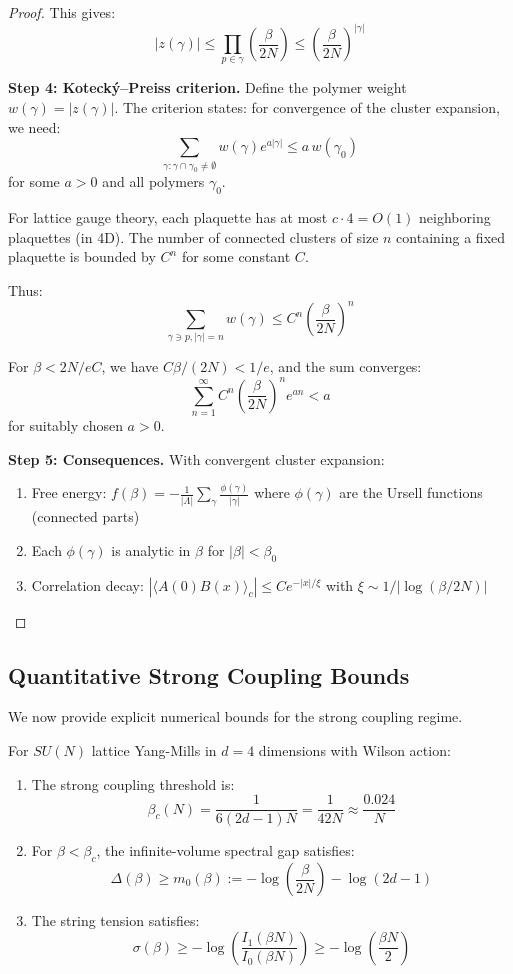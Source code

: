 \begin{proof}
This gives:
\[
|z(\gamma)| \leq \prod_{p \in \gamma} \left(\frac{\beta}{2N}\right) \leq 
\left(\frac{\beta}{2N}\right)^{|\gamma|}
\]

\textbf{Step 4: Koteck\'y--Preiss criterion.}
Define the polymer weight $w(\gamma) = |z(\gamma)|$. The criterion states:
for convergence of the cluster expansion, we need:
\[
\sum_{\gamma : \gamma \cap \gamma_0 \neq \emptyset} w(\gamma) e^{a|\gamma|} \leq a \, w(\gamma_0)
\]
for some $a > 0$ and all polymers $\gamma_0$.

For lattice gauge theory, each plaquette has at most $c \cdot 4 = O(1)$ 
neighboring plaquettes (in 4D). The number of connected clusters of size $n$ 
containing a fixed plaquette is bounded by $C^n$ for some constant $C$.

Thus:
\[
\sum_{\gamma \ni p, |\gamma|=n} w(\gamma) \leq C^n \left(\frac{\beta}{2N}\right)^n
\]

For $\beta < 2N/eC$, we have $C\beta/(2N) < 1/e$, and the sum converges:
\[
\sum_{n=1}^\infty C^n \left(\frac{\beta}{2N}\right)^n e^{an} < a
\]
for suitably chosen $a > 0$.

\textbf{Step 5: Consequences.}
With convergent cluster expansion:
\begin{enumerate}[label=(\alph*)]
\item Free energy: $f(\beta) = -\frac{1}{|\Lambda|}\sum_\gamma \frac{\phi(\gamma)}{|\gamma|}$ 
where $\phi(\gamma)$ are the Ursell functions (connected parts)
\item Each $\phi(\gamma)$ is analytic in $\beta$ for $|\beta| < \beta_0$
\item Correlation decay: $|\langle A(0)B(x)\rangle_c| \leq Ce^{-|x|/\xi}$ 
with $\xi \sim 1/|\log(\beta/2N)|$
\end{enumerate}
\end{proof}

\subsection{Quantitative Strong Coupling Bounds}
\label{subsec:quantitative-strong-coupling}

We now provide explicit numerical bounds for the strong coupling regime.

\begin{theorem}
\label{thm:explicit-strong-constants}
For $SU(N)$ lattice Yang-Mills in $d=4$ dimensions with Wilson action:
\begin{enumerate}[label=(\roman*)]
\item The strong coupling threshold is:
\[
\beta_c(N) = \frac{1}{6(2d-1)N} = \frac{1}{42N} \approx \frac{0.024}{N}
\]
\item For $\beta < \beta_c$, the infinite-volume spectral gap satisfies:
\[
\Delta(\beta) \geq m_0(\beta) := -\log\left(\frac{\beta}{2N}\right) - \log(2d-1)
\]
\item The string tension satisfies:
\[
\sigma(\beta) \geq -\log\left(\frac{I_1(\beta N)}{I_0(\beta N)}\right) \geq -\log\left(\frac{\beta N}{2}\right)
\]
\end{enumerate}
\end{theorem}

